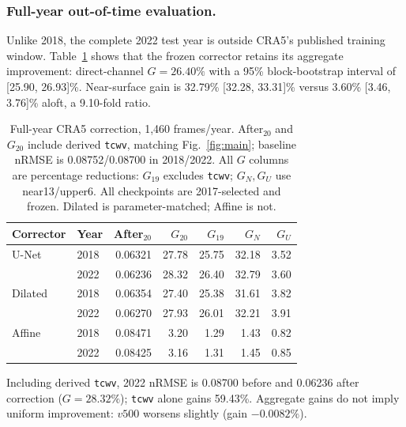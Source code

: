 \subsubsection{Full-year out-of-time evaluation.}
Unlike 2018, the complete 2022 test year is outside CRA5's published training
window. Table~\ref{tab:outtime} shows that the frozen corrector retains its
aggregate improvement: direct-channel $G=26.40\%$ with a 95\% block-bootstrap
interval of [25.90, 26.93]\%. Near-surface gain is 32.79\% [32.28, 33.31]\%
versus 3.60\% [3.46, 3.76]\% aloft, a 9.10-fold ratio.

\begin{table}[t]
\centering
\caption{Full-year CRA5 correction, 1{,}460 frames/year. After$_{20}$ and $G_{20}$
include derived \texttt{tcwv}, matching Fig.~\ref{fig:main}; baseline nRMSE is
0.08752/0.08700 in 2018/2022. All $G$ columns are percentage reductions:
$G_{19}$ excludes \texttt{tcwv}; $G_N,G_U$ use near13/upper6. All checkpoints
are 2017-selected and frozen. Dilated is parameter-matched; Affine is not.}
\label{tab:outtime}
\begin{tabular}{llr@{\hspace{1.5em}}rrrr}
\toprule
Corrector & Year & After$_{20}$ & $G_{20}$ & $G_{19}$ & $G_N$ & $G_U$ \\
\midrule
U-Net & 2018 & 0.06321 & 27.78 & 25.75 & 32.18 & 3.52 \\
 & 2022 & 0.06236 & 28.32 & 26.40 & 32.79 & 3.60 \\
Dilated & 2018 & 0.06354 & 27.40 & 25.38 & 31.61 & 3.82 \\
 & 2022 & 0.06270 & 27.93 & 26.01 & 32.21 & 3.91 \\
Affine & 2018 & 0.08471 & 3.20 & 1.29 & 1.43 & 0.82 \\
 & 2022 & 0.08425 & 3.16 & 1.31 & 1.45 & 0.85 \\
\bottomrule
\end{tabular}
\end{table}

Including derived \texttt{tcwv}, 2022 nRMSE is 0.08700 before and 0.06236 after
correction ($G=28.32\%$); \texttt{tcwv} alone gains 59.43\%. Aggregate gains
do not imply uniform improvement: $v500$ worsens slightly (gain $-0.0082\%$).
